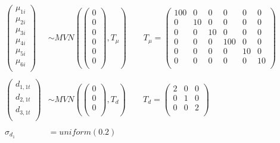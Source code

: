 \documentclass[11pt,final,fleqn]{article}\usepackage[]{graphicx}\usepackage[]{color}
\theoremstyle{plain}
\begin{document}
{\begin{equation} \label{eqn:multistate-nma-priors}
\begin{aligned}
\begin{pmatrix}
\mu_{1i}  \\
\mu_{2i}  \\
\mu_{3i}  \\
\mu_{4i}  \\
\mu_{5i}  \\
\mu_{6i}  \\
\end{pmatrix} 
&\sim 
MVN\left(
\begin{pmatrix}
0  \\
0  \\
0  \\
0  \\
0  \\
0 \\
\end{pmatrix}, 
T_\mu
\right) 
\qquad
T_\mu =
\begin{pmatrix}
100 & 0 & 0 & 0 & 0 & 0 \\
0 & 10 & 0 & 0 & 0 & 0 \\
0 & 0 & 10 & 0 & 0 & 0 \\
0 & 0 & 0 & 100 & 0 & 0 \\
0 & 0 & 0 & 0 & 10 & 0 \\
0 & 0 & 0 & 0 & 0 & 10 \\
\end{pmatrix}\\\\
%
\begin{pmatrix}
d_{1, 1t}  \\
d_{2, 1t}  \\
d_{3, 1t}  \\
\end{pmatrix} 
&\sim 
MVN\left(
\begin{pmatrix}
0  \\
0  \\
0 \\
\end{pmatrix}, 
T_d
\right) 
\qquad
T_d =
\begin{pmatrix}
2 & 0 & 0  \\
0 & 1 & 0   \\
0 & 0 & 2  \\
\end{pmatrix} \\
%
\\
\sigma_{d_{1}} &= uniform(0.2)  \\
\end{aligned}
\end{equation}

}
\end{document}
